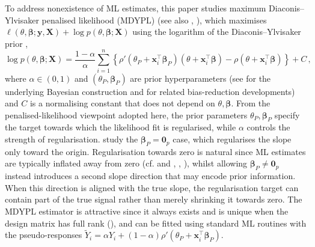 \documentclass{article}
\theoremstyle{definition}
\newcommand*{\bb}{\boldsymbol}
\def\bX{\bb{X}}
\def\bx{\bb{x}}
\def\by{\bb{y}}
\def\Ytil{\widetilde{Y}}
\def\bbeta{\bb{\beta}}
\begin{document}
\begin{bibunit}
To address nonexistence of ML estimates, this paper studies maximum
Diaconis--Ylvisaker penalised likelihood (MDYPL) (see also \citealt{sterzinger+kosmidis:2026}, \citealt{rigon+aliverti:2023}), 
which maximises $
\ell(\theta,\bbeta;\by,\bX)+\log p(\theta,\bbeta;\bX)
$ using the logarithm of the Diaconis--Ylvisaker prior \citep{diaconis+ylvisaker:1979},
$$
	\log p(\theta, \bbeta; \bX) = \frac{1 - \alpha}{\alpha} \sum_{i = 1}^{n} \left\{ \rho'\left(\theta_P + \bx_i^\top \bbeta_P\right)\left( \theta + \bx_i^\top \bbeta \right) - \rho\left(\theta + \bx_i^\top \bbeta \right) \right\} + C \,, 
$$
where $\alpha\in(0,1)$ and $(\theta_P,\bbeta_P)$ are prior hyperparameters
(see \citealt{diaconis+ylvisaker:1979} for the underlying Bayesian
construction and \citealt{rigon+aliverti:2023} for related bias-reduction
developments) and $C$ is a normalising constant that does not depend on $\theta, \bbeta$.  
From the penalised-likelihood viewpoint adopted here, the
prior parameters $\theta_P, \bbeta_P$ specify the 
target towards which the likelihood fit is regularised, while $\alpha$
controls the strength of regularisation. 
\citet{sterzinger+kosmidis:2026} study the $\bbeta_P = \bb{0}_p$ case, which 
regularises the slope only toward the origin. 
Regularisation towards zero
is natural since ML estimates are typically inflated away from zero (cf. \citealt[Section~8]{cordeiro+mccullagh:1991} and \citealt{sterzinger+kosmidis:2026}, \citealt{zhao+etal:2022}, \citealt{sur+candes:2019}), whilst
allowing
$\bbeta_P\neq\bb0_p$ instead introduces a second slope direction that may
encode prior information. When this direction is aligned with the true
slope, the regularisation target can contain part of the true signal rather
than merely shrinking it towards zero.
The MDYPL estimator is attractive since it always exists
and is unique when the design matrix has full rank
(\citealt[Theorem~1]{rigon+aliverti:2023}), and can be fitted using standard
ML routines with the pseudo-responses $\Ytil_i
    =
    \alpha Y_i
    +(1-\alpha)
    \rho'\left(\theta_P+\bx_i^\top\bbeta_P\right)$. 


\end{bibunit}
\end{document}
